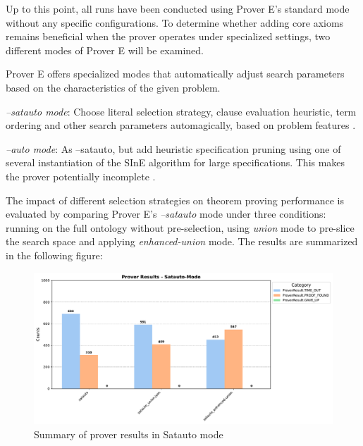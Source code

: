 \documentclass[english,version-2020-11]{uzl-thesis}
\begin{document}
Up to this point, all runs have been conducted using Prover E's standard mode without any specific configurations. To determine whether adding core axioms remains beneficial when the prover operates under specialized settings, two different modes of Prover E will be examined.

Prover E offers specialized modes that automatically adjust search parameters based on the characteristics of the given problem.

\begin{definition}
    \textit{--satauto mode}: Choose literal selection strategy, clause evaluation heuristic, term ordering and other search
    parameters automagically, based on problem features \cite{schulz2019eprover}.
\end{definition}

\begin{definition}
    \textit{--auto mode}: As --satauto, but add heuristic specification
    pruning using one of several instantiation of the
    SInE algorithm for large specifications.
    This makes the prover potentially incomplete \cite{schulz2019eprover}.
\end{definition}


The impact of different selection strategies on theorem proving performance is evaluated by comparing Prover E's \textit{--satauto} mode under three conditions: running on the full ontology without pre-selection, using \textit{union} mode to pre-slice the search space and applying \textit{enhanced-union} mode. The results are summarized in the following figure:

\begin{figure}[h!]
    \centering
    \includegraphics[width=\textwidth]{satauto_mode_output.pdf}
    \caption{Summary of prover results in Satauto mode}
    \label{fig:prover_results_satauto}
\end{figure}
\FloatBarrier
\end{document}
